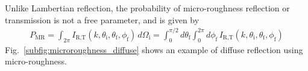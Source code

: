 Unlike Lambertian reflection, the probability of micro-roughness reflection or transmission is not a free parameter, and is given by
%
\begin{gather}
    P_\text{MR}=\int_{2\pi} I_\text{R,T}(k, \theta_\text{i}, \theta_\text{f}, \phi_\text{f})\,d\Omega_\text{i}=\int_0^{\pi/2}d\theta_\text{f}\int_0^{2\pi}d\phi_\text{f}\,I_\text{R,T}(k, \theta_\text{i}, \theta_\text{f}, \phi_\text{f})
\end{gather}
%
Fig.~\ref{subfig:microroughness_diffuse} shows an example of diffuse reflection using micro-roughness.